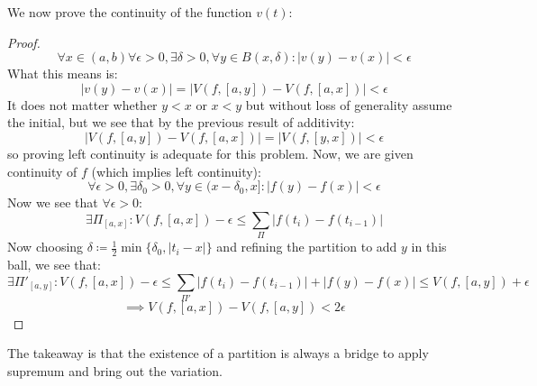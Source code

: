 \documentclass[10pt,letterpaper]{article} %
\begin{document}
We now prove the continuity of the function $v(t)$:
\begin{proof}
\begin{equation*}
\forall x \in (a, b) \forall \epsilon > 0, \exists \delta > 0, \forall y \in B(x, \delta): |v(y) - v(x)| < \epsilon
\end{equation*}
What this means is:
\begin{equation*}
|v(y) - v(x)| = |V(f, [a, y]) - V(f, [a, x])| < \epsilon
\end{equation*}
It does not matter whether $y < x$ or $x < y$ but without loss of generality assume the initial, but we see that by the previous result of additivity:
\begin{equation*}
|V(f, [a, y]) - V(f, [a, x])| = |V(f, [y, x])| < \epsilon
\end{equation*}
so proving left continuity is adequate for this problem. Now, we are given continuity of $f$ (which implies left continuity):
\begin{equation*}
\forall \epsilon > 0, \exists \delta_0 > 0, \forall y \in (x- \delta_0, x]: |f(y) - f(x)| < \epsilon
\end{equation*}
Now we see that $\forall \epsilon > 0$:
\begin{equation*}
\exists \Pi_{[a, x]}: V(f, [a, x]) - \epsilon \leqslant \sum_{\Pi}|f(t_i) - f(t_{i-1})|
\end{equation*}
Now choosing $\delta \coloneq \frac{1}{2}\min\{\delta_0, |t_i - x|\}$  and refining the partition to add $y$ in this ball, we see that:
\begin{equation*}
\exists \Pi'_{[a, y]}: V(f, [a, x]) - \epsilon \leqslant \sum_{\Pi'}|f(t_i) - f(t_{i-1})| + |f(y) - f(x)| \leqslant V(f, [a, y]) + \epsilon
\end{equation*}
\begin{equation*}
\implies V(f, [a, x]) - V(f, [a, y]) < 2\epsilon
\end{equation*}
\end{proof}

The takeaway is that the existence of a partition is always a bridge to apply supremum and bring out the variation.
\end{document}
